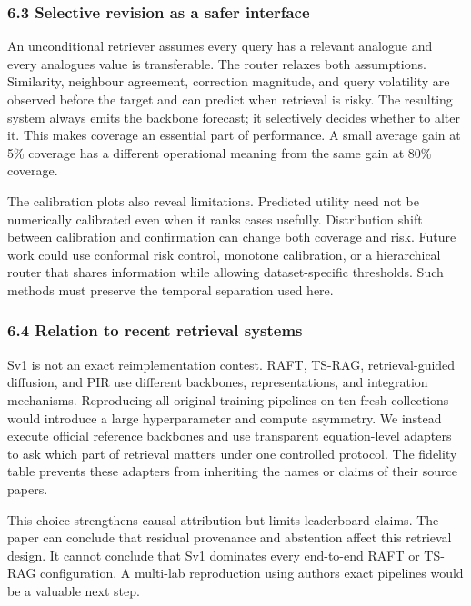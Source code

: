 \documentclass[
]{article}
\begin{document}
\subsubsection{6.3 Selective revision as a safer
interface}\label{63-selective-revision-as-a-safer-interface}

An unconditional retriever assumes every query has a relevant analogue
and every analogue\textquotesingle s value is transferable. The router
relaxes both assumptions. Similarity, neighbour agreement, correction
magnitude, and query volatility are observed before the target and can
predict when retrieval is risky. The resulting system always emits the
backbone forecast; it selectively decides whether to alter it. This
makes coverage an essential part of performance. A small average gain at
5\% coverage has a different operational meaning from the same gain at
80\% coverage.

The calibration plots also reveal limitations. Predicted utility need
not be numerically calibrated even when it ranks cases usefully.
Distribution shift between calibration and confirmation can change both
coverage and risk. Future work could use conformal risk control,
monotone calibration, or a hierarchical router that shares information
while allowing dataset-specific thresholds. Such methods must preserve
the temporal separation used here.

\subsubsection{6.4 Relation to recent retrieval
systems}\label{64-relation-to-recent-retrieval-systems}

Sv1 is not an exact reimplementation contest. RAFT, TS-RAG,
retrieval-guided diffusion, and PIR use different backbones,
representations, and integration mechanisms. Reproducing all original
training pipelines on ten fresh collections would introduce a large
hyperparameter and compute asymmetry. We instead execute official
reference backbones and use transparent equation-level adapters to ask
which part of retrieval matters under one controlled protocol. The
fidelity table prevents these adapters from inheriting the names or
claims of their source papers.

This choice strengthens causal attribution but limits leaderboard
claims. The paper can conclude that residual provenance and abstention
affect this retrieval design. It cannot conclude that Sv1 dominates
every end-to-end RAFT or TS-RAG configuration. A multi-lab reproduction
using authors\textquotesingle{} exact pipelines would be a valuable next
step.
\end{document}
